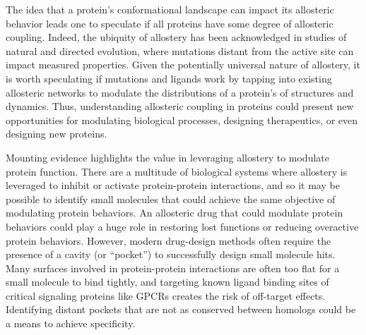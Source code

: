 \documentclass[../main.tex]{subfiles}
\begin{document}
		The idea that a protein’s conformational landscape can impact its allosteric behavior leads one to speculate if all proteins have some degree of allosteric coupling\cite{Gunasekaran:2004kq}. Indeed, the ubiquity of allostery has been acknowledged in studies of natural and directed evolution\cite{romero_exploring_2009,Salverda:2010db}, where mutations distant from the active site can impact measured properties. Given the potentially universal nature of allostery, it is worth speculating if mutations and ligands work by tapping into existing allosteric networks to modulate the distributions of a protein's of structures and dynamics\cite{Knoverek:2018kk}. Thus, understanding allosteric coupling in proteins could present new opportunities for modulating biological processes, designing therapeutics, or even designing new proteins. 

		Mounting evidence highlights the value in leveraging allostery to modulate protein function. There are a multitude of biological systems where allostery is leveraged to inhibit or activate protein-protein interactions, and so it may be possible to identify small molecules that could achieve the same objective of modulating protein behaviors. An allosteric drug that could modulate protein behaviors could play a huge role in restoring lost functions or reducing overactive protein behaviors. However, modern drug-design methods often require the presence of a cavity (or “pocket”) to successfully design small molecule hits. Many surfaces involved in protein-protein interactions are often too flat for a small molecule to bind tightly\cite{arkin_small-molecule_2004}, and targeting known ligand binding sites of critical signaling proteins like GPCRs creates the risk of off-target effects. Identifying distant pockets that are not as conserved between homologs could be a means to achieve specificity\cite{ivetac_mapping_2010}.
\end{document}
